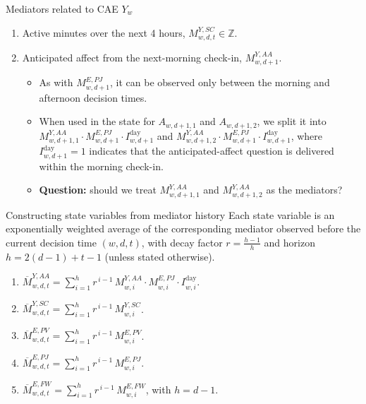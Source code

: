 \documentclass[10pt]{beamer}					%
\begin{document}
\begin{frame}{Mediators related to CAE $Y_w$}
    \begin{enumerate}
        \item Active minutes over the next 4 hours, $M^{Y,SC}_{w,d,t} \in \mathbb{Z}$.
        \item Anticipated affect from the next-morning check-in, $M^{Y,AA}_{w,d+1}$.
        \begin{itemize}
            \item As with $M^{E,PJ}_{w,d+1}$, it can be observed only between the morning and afternoon decision times.
            \item When used in the state for $A_{w,d+1,1}$ and $A_{w,d+1,2}$, we split it into
            $M^{Y,AA}_{w,d+1,1}\cdot M^{E,PJ}_{w,d+1} \cdot I_{w,d+1}^{\text{day}}$ and
            $M^{Y,AA}_{w,d+1,2}\cdot M^{E,PJ}_{w,d+1} \cdot I_{w,d+1}^{\text{day}}$,
            where $I_{w,d+1}^{\text{day}}=1$ indicates that the anticipated-affect question is delivered within the morning check-in.
            \item \textbf{Question:} should we treat $M^{Y,AA}_{w,d+1,1}$ and $M^{Y,AA}_{w,d+1,2}$ as the mediators?
        \end{itemize}
    \end{enumerate}
\end{frame}

\begin{frame}{Constructing state variables from mediator history}
    Each state variable is an exponentially weighted average of the corresponding mediator observed before the current decision time $(w,d,t)$, with decay factor $r=\tfrac{h-1}{h}$ and horizon $h = 2(d-1) + t-1$ (unless stated otherwise).
    \begin{enumerate}
        \item $\overline{M}^{Y,AA}_{w,d,t}=\displaystyle\sum_{i=1}^{h} r^{\,i-1}\, M^{Y,AA}_{w,i}\cdot M^{E,PJ}_{w,i} \cdot I_{w,i}^{\text{day}}$.
        \item $\overline{M}^{Y,SC}_{w,d,t}=\displaystyle\sum_{i=1}^{h} r^{\,i-1}\, M^{Y,SC}_{w,i}$.
        \item $\overline{M}^{E,PV}_{w,d,t}=\displaystyle\sum_{i=1}^{h} r^{\,i-1}\, M^{E,PV}_{w,i}$.
        \item $\overline{M}^{E,PJ}_{w,d,t}=\displaystyle\sum_{i=1}^{h} r^{\,i-1}\, M^{E,PJ}_{w,i}$.
        \item $\overline{M}^{E,FW}_{w,d,t}=\displaystyle\sum_{i=1}^{h} r^{\,i-1}\, M^{E,FW}_{w,i}$, with $h=d-1$.
    \end{enumerate}
\end{frame}
\end{document}
